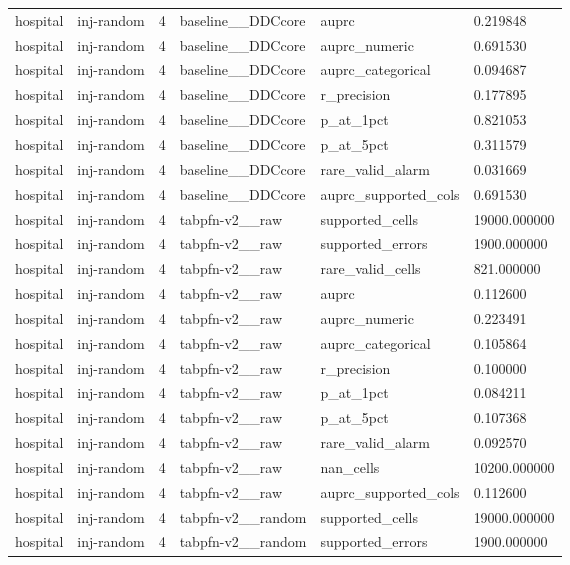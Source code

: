 \begin{tabular}{llllll}
hospital & inj-random & 4 & baseline\_\_DDCcore & auprc & 0.219848 \\
hospital & inj-random & 4 & baseline\_\_DDCcore & auprc\_numeric & 0.691530 \\
hospital & inj-random & 4 & baseline\_\_DDCcore & auprc\_categorical & 0.094687 \\
hospital & inj-random & 4 & baseline\_\_DDCcore & r\_precision & 0.177895 \\
hospital & inj-random & 4 & baseline\_\_DDCcore & p\_at\_1pct & 0.821053 \\
hospital & inj-random & 4 & baseline\_\_DDCcore & p\_at\_5pct & 0.311579 \\
hospital & inj-random & 4 & baseline\_\_DDCcore & rare\_valid\_alarm & 0.031669 \\
hospital & inj-random & 4 & baseline\_\_DDCcore & auprc\_supported\_cols & 0.691530 \\
hospital & inj-random & 4 & tabpfn-v2\_\_raw & supported\_cells & 19000.000000 \\
hospital & inj-random & 4 & tabpfn-v2\_\_raw & supported\_errors & 1900.000000 \\
hospital & inj-random & 4 & tabpfn-v2\_\_raw & rare\_valid\_cells & 821.000000 \\
hospital & inj-random & 4 & tabpfn-v2\_\_raw & auprc & 0.112600 \\
hospital & inj-random & 4 & tabpfn-v2\_\_raw & auprc\_numeric & 0.223491 \\
hospital & inj-random & 4 & tabpfn-v2\_\_raw & auprc\_categorical & 0.105864 \\
hospital & inj-random & 4 & tabpfn-v2\_\_raw & r\_precision & 0.100000 \\
hospital & inj-random & 4 & tabpfn-v2\_\_raw & p\_at\_1pct & 0.084211 \\
hospital & inj-random & 4 & tabpfn-v2\_\_raw & p\_at\_5pct & 0.107368 \\
hospital & inj-random & 4 & tabpfn-v2\_\_raw & rare\_valid\_alarm & 0.092570 \\
hospital & inj-random & 4 & tabpfn-v2\_\_raw & nan\_cells & 10200.000000 \\
hospital & inj-random & 4 & tabpfn-v2\_\_raw & auprc\_supported\_cols & 0.112600 \\
hospital & inj-random & 4 & tabpfn-v2\_\_random & supported\_cells & 19000.000000 \\
hospital & inj-random & 4 & tabpfn-v2\_\_random & supported\_errors & 1900.000000 \\

\end{tabular}
